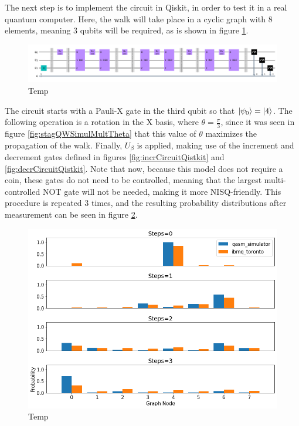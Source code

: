 \documentclass[../../dissertation.tex]{subfiles}
\begin{document}
The next step is to implement the circuit in Qiskit, in order to test it in a
real quantum computer. Here, the walk will take place in a cyclic graph with
$8$ elements, meaning 3 qubits will be required, as is shown in figure
\ref{fig:stagQWCircuitQistkit}.
\begin{figure}[!h]
	\centering
	\includegraphics[scale=0.32]{img/Qiskit/StaggeredQW/Circuits/circStagQW_N3_S3.png}
	\caption{Temp} 
	\label{fig:stagQWCircuitQistkit}
\end{figure}
The circuit starts with a Pauli-X gate in the third qubit so that $\ket{\psi_0}
= \ket{4}$. The following operation is a rotation in the X basis, where $\theta
= \frac{\pi}{3}$, since it was seen in figure \ref{fig:stagQWSimulMultTheta}
that this value of $\theta$ maximizes the propagation of the walk. Finally,
$U_\beta$ is applied, making use of the increment and decrement gates defined
in figures \ref{fig:incrCircuitQistkit} and \ref{fig:decrCircuitQistkit}. Note
that now, because this model does not require a coin, these gates do not need
to be controlled, meaning that the largest multi-controlled NOT gate will not
be needed, making it more NISQ-friendly. This procedure is repeated
$3$ times, and the resulting probability distributions after measurement can be
seen in figure \ref{fig:stagQWQiskitDist}. 
\begin{figure}[!h]
	\centering
	\includegraphics[scale=0.40]{img/Qiskit/StaggeredQW/StagQW_N3_S0123.png}
	\caption{Temp} 
	\label{fig:stagQWQiskitDist}
\end{figure}\par
\end{document}
